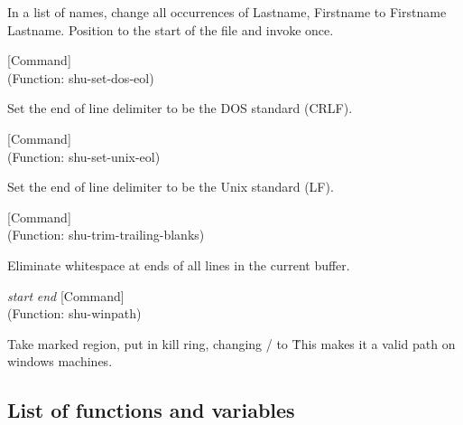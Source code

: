 \begin{doc-string}
In a list of names, change all occurrences
of Lastname, Firstname to Firstname Lastname.
Position to the start of the file and invoke once.
\end{doc-string}

\vspace{1em}
\noindent
{}
\usebox{\funcname}
 \hfill [Command]\\%
 (Function: shu-set-dos-eol)

\begin{doc-string}
Set the end of line delimiter to be the DOS standard (CRLF).
\end{doc-string}

\vspace{1em}
\noindent
{}
\usebox{\funcname}
 \hfill [Command]\\%
 (Function: shu-set-unix-eol)

\begin{doc-string}
Set the end of line delimiter to be the Unix standard (LF).
\end{doc-string}

\vspace{1em}
\noindent
{}
\usebox{\funcname}
 \hfill [Command]\\%
 (Function: shu-trim-trailing-blanks)

\begin{doc-string}
Eliminate whitespace at ends of all lines in the current buffer.
\end{doc-string}

\vspace{1em}
\noindent
{}
\usebox{\funcname}\emph{start} \emph{end}
 \hfill [Command]\\%
 (Function: shu-winpath)

\begin{doc-string}
Take marked region, put in kill ring, changing / to \.
This makes it a valid path on windows machines.
\end{doc-string}

\subsection{List of functions and variables}

